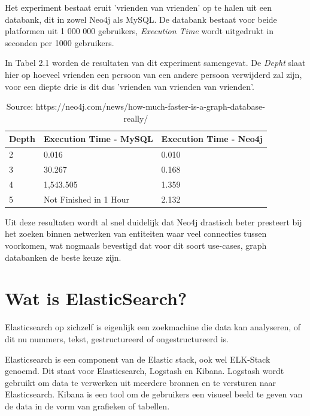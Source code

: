 Het experiment bestaat eruit 'vrienden van vrienden' op te halen uit een databank, dit in zowel Neo4j als MySQL. De databank bestaat voor beide platformen uit 1 000 000 gebruikers, \textit{Execution Time} wordt uitgedrukt in seconden per 1000 gebruikers.

In Tabel 2.1 worden de resultaten van dit experiment samengevat. De \textit{Depht} slaat hier op hoeveel vrienden een persoon van een andere persoon verwijderd zal zijn, voor een diepte drie is dit dus 'vrienden van vrienden van vrienden'.

	\begin{table}
		\centering
		\begin{tabular}{|l|l|l|}
			\hline
			Depth & Execution Time - MySQL                                & Execution Time - Neo4j \\ \hline
			2     & 0.016                                                 & 0.010                  \\ \hline
			3     &  30.267 & 0.168                  \\ \hline
			4     & 1,543.505                                             & 1.359                  \\ \hline
			5     & Not Finished in 1 Hour                                & 2.132                  \\ \hline
		\end{tabular}
	\caption{\label{tab:Neo4j - MySql Comparison} Source: https://neo4j.com/news/how-much-faster-is-a-graph-database-really/}
	\end{table}


Uit deze resultaten wordt al snel duidelijk dat Neo4j drastisch beter presteert bij het zoeken binnen netwerken van entiteiten waar veel connecties tussen voorkomen, wat nogmaals bevestigd dat voor dit soort use-cases, graph databanken de beste keuze zijn.



\section{Wat is ElasticSearch?}
\label{sec:wat is ElasticSearch?}

Elasticsearch op zichzelf is eigenlijk een zoekmachine die data kan analyseren, of dit nu nummers, tekst, gestructureerd of ongestructureerd is. 

Elasticsearch is een component van de Elastic stack, ook wel ELK-Stack genoemd. Dit staat voor Elasticsearch, Logstash en Kibana. Logstash wordt gebruikt om data te verwerken uit meerdere bronnen en te versturen naar Elasticsearch. Kibana is een tool om de gebruikers een visueel beeld te geven van de data in de vorm van grafieken of tabellen.

